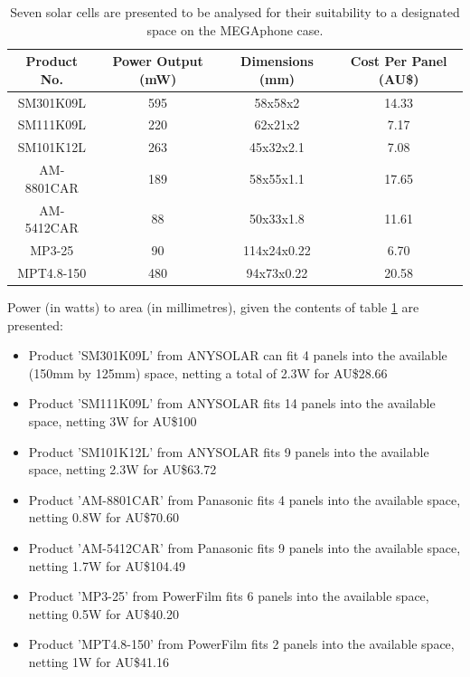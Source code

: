 \begin{table} [h]
    \begin{center}
        \vspace{5mm}
        \caption{Seven solar cells are presented to be analysed for their suitability to a designated space on the MEGAphone case.}
        \label{tab:Solar}
        \begin{tabular}{ |c|c|c|c| }
        \hline
        Product No. & Power Output (mW) & Dimensions (mm) & Cost Per Panel (AU\$) \\
        \hline
        SM301K09L \cite{SM301K09L} & 595 & 58x58x2 & 14.33 \\
        \hline
        SM111K09L \cite{SM111K09L} & 220 & 62x21x2 & 7.17 \\ 
        \hline
        SM101K12L \cite{SM101K12L} & 263 & 45x32x2.1 & 7.08 \\
        \hline
        AM-8801CAR \cite{am8801} & 189 & 58x55x1.1 & 17.65 \\
        \hline
        AM-5412CAR \cite{am5412} & 88 & 50x33x1.8 & 11.61 \\
        \hline
        MP3-25 \cite{mp3} & 90 & 114x24x0.22 & 6.70 \\
        \hline
        MPT4.8-150 \cite{mpt} & 480 & 94x73x0.22 & 20.58 \\
        \hline
        \end{tabular}
    \end{center}
\end{table}

Power (in watts) to area (in millimetres), given the contents of table \ref{tab:Solar} are presented:
\begin{itemize}
    \item Product 'SM301K09L' \cite{SM301K09L} from ANYSOLAR can fit 4 panels into the available (150mm by 125mm) space, netting a total of 2.3W for AU\$28.66
    \item Product 'SM111K09L' \cite{SM111K09L} from ANYSOLAR fits 14 panels into the available space, netting 3W for AU\$100
    \item Product 'SM101K12L' \cite{SM101K12L} from ANYSOLAR fits 9 panels into the available space, netting 2.3W for AU\$63.72
    \item Product 'AM-8801CAR' \cite{am8801} from Panasonic fits 4 panels into the available space, netting 0.8W for AU\$70.60
    \item Product 'AM-5412CAR' \cite{am5412} from Panasonic fits 9 panels into the available space, netting 1.7W for AU\$104.49
    \item Product 'MP3-25' \cite{mp3} from PowerFilm fits 6 panels into the available space, netting 0.5W for AU\$40.20
    \item Product 'MPT4.8-150' \cite{mpt} from PowerFilm fits 2 panels into the available space, netting 1W for AU\$41.16
\end{itemize}

